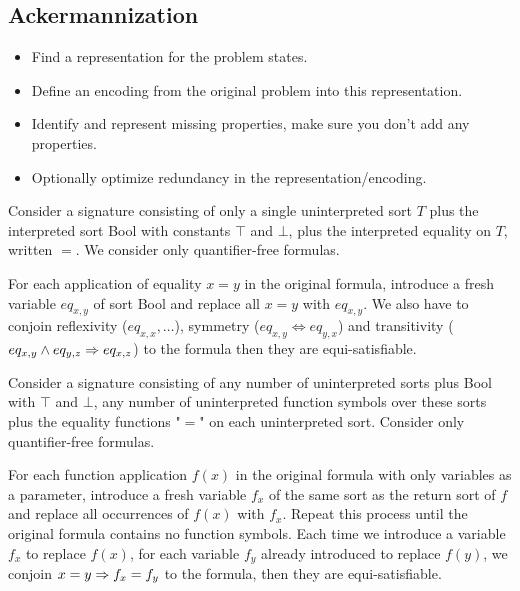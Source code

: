 \subsection{Ackermannization}
\begin{mytitle} \hfill
\begin{itemize}
    \item Find a representation for the problem states.
    \item Define an encoding from the original problem into this representation.
    \item Identify and represent missing properties, make sure you don't add any properties.
    \item Optionally optimize redundancy in the representation/encoding.
\end{itemize}
\end{mytitle}
\begin{mytitle}[Equality] 
    \begin{mysubtitle}  Consider a signature consisting of only a single uninterpreted sort $T$ plus the interpreted sort Bool with constants $\top$ and $\bot$, plus the interpreted equality on $T$, written $=$. We consider only quantifier-free formulas. 
    \end{mysubtitle}
    \begin{mysubtitle}[Ackermannization] For each application of equality $x=y$ in the original formula, introduce a fresh variable $eq_{x,y}$ of sort Bool and replace all $x=y$ with $eq_{x,y}$. We also have to conjoin reflexivity ($eq_{x,x}, \ldots$), symmetry ($eq_{x,y} \Leftrightarrow eq_{y,x}$) and transitivity ($eq_{x,y} \land eq_{y,z} \Rightarrow eq_{x,z}$) to the formula then they are equi-satisfiable.
    \end{mysubtitle}
\end{mytitle}
\begin{mytitle} 
    \begin{mysubtitle}  Consider a signature consisting of any number of uninterpreted sorts plus Bool with $\top$ and $\bot$, any number of uninterpreted function symbols over these sorts plus the equality functions "$=$" on each uninterpreted sort. Consider only quantifier-free formulas.
    \end{mysubtitle}
    \begin{mysubtitle}[Ackermannization] For each function application $f(x)$ in the original formula with only variables as a parameter, introduce a fresh variable $f_x$ of the same sort as the return sort of $f$ and replace all occurrences of $f(x)$ with $f_x$. Repeat this process until the original formula contains no function symbols. Each time we introduce a variable $f_x$ to replace $f(x)$, for each variable $f_y$ already introduced to replace $f(y)$, we conjoin $x=y \Rightarrow f_x = f_y$ to the formula, then they are equi-satisfiable.
    \end{mysubtitle}
\end{mytitle}
